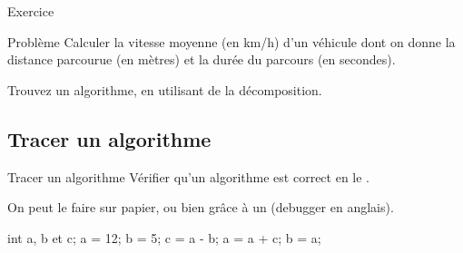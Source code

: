 \begin{frame}{Exercice}
  \begin{block}{Problème}
    Calculer la vitesse moyenne (en km/h) d’un véhicule dont on donne la
    distance parcourue (en mètres) et la durée du parcours (en secondes).
  \end{block}

  Trouvez un algorithme, en utilisant de la décomposition.
\end{frame}

\subsection{Tracer un algorithme}
\begin{frame}[fragile]{Tracer un algorithme}
  Vérifier qu'un algorithme est correct en le .

  On peut le faire sur papier, ou bien grâce à un 
  (debugger en anglais).
  \begin{java}
int a, b et c;
a = 12;
b = 5;
c = a - b;
a = a + c;
b = a;
  \end{java}
\end{frame}

